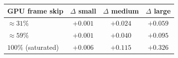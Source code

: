 \begin{tabular}{lccc}
\toprule
GPU frame skip & $\Delta$ small & $\Delta$ medium & $\Delta$ large \\
\midrule
$\approx31\%$  & $+0.001$ & $+0.024$ & $+0.059$ \\
$\approx59\%$  & $+0.001$ & $+0.040$ & $+0.095$ \\
$100\%$ (saturated)  & $+0.006$ & $+0.115$ & $+0.326$ \\
\bottomrule
\end{tabular}
